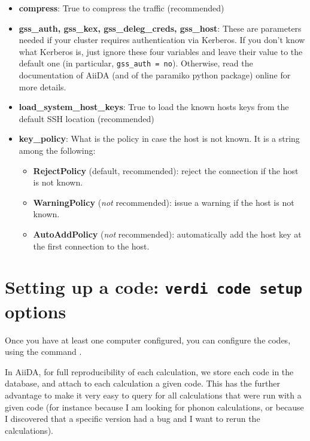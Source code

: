 \begin{appendices}
\begin{itemize}
\item {} 
\textbf{compress}: True to compress the traffic (recommended)

\item {} 
\textbf{gss\_auth, gss\_kex, gss\_deleg\_creds, gss\_host}: These are parameters needed if your cluster requires authentication via Kerberos. If you don't know what Kerberos is, just ignore these four variables and leave their value to the default one (in particular, \texttt{gss\_auth = no}). Otherwise, read the documentation of AiiDA (and of the paramiko python package) online for more details.

\item {} 
\textbf{load\_system\_host\_keys}: True to load the known hosts keys from the
default SSH location (recommended)

\item {} 
\textbf{key\_policy}: What is the policy in case the host is not known.
It is a string among the following:
\begin{itemize}
\item {} 
\textbf{RejectPolicy} (default, recommended): reject the connection if the
host is not known.

\item {} 
\textbf{WarningPolicy} (\emph{not} recommended): issue a warning if the
host is not known.

\item {} 
\textbf{AutoAddPolicy} (\emph{not} recommended): automatically add the host key
at the first connection to the host.

\end{itemize}

\end{itemize}

\section{\label{app:codesetup}Setting up a code: \texttt{verdi code setup} options}

Once you have at least one computer configured, you can configure the codes, using the command .

In AiiDA, for full reproducibility of each calculation, we store each code in the database, and attach to each calculation a given code. This has the further advantage to make it very easy to query for all calculations that were run with a given code (for instance because I am looking for phonon calculations, or because I discovered that a specific version had a bug and I want to rerun the calculations).


\end{appendices}
